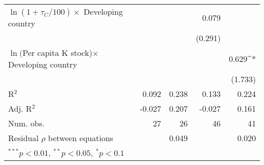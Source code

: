 \begin{table}
\begin{center}
\begin{tabular}{l D{.}{.}{3.4}@{} D{.}{.}{3.5}@{} D{.}{.}{3.4}@{} D{.}{.}{3.4}@{} }
$\ln(1+\tau_{C}/100)\times$ Developing country            &          &            & 0.079    &           \\
                                                      &          &            & (0.291)  &           \\
$\ln($Per capita K stock)$\times$ Developing country&          &            &          & 0.629^{*} \\
                                                      &          &            &          & (1.733)   \\
\hline
R$^2$                                                 & 0.092    & 0.238      & 0.133    & 0.224     \\
Adj. R$^2$                                            & -0.027   & 0.207      & -0.027   & 0.161     \\
Num. obs. & 27 & 26 & 46 & 41            \\
Residual $\rho$ between equations                     &          & 0.049      &          & 0.020     \\
\hline
{}
\end{tabular}
\label{table:coefficients}
\end{center}
\end{table}
